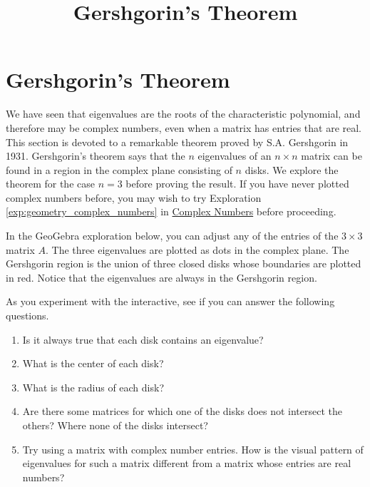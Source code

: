 \documentclass{ximera}
\title{Gershgorin's Theorem} \license{CC BY-NC-SA 4.0}
\begin{document}
\begin{abstract}
\end{abstract}
\maketitle

\section*{Gershgorin's Theorem}
We have seen that eigenvalues are the roots of the characteristic polynomial, and therefore may be complex numbers, even when a matrix has entries that are real.  This section is devoted to a remarkable theorem proved by S.A. Gershgorin in 1931. Gershgorin's theorem says that the $n$ eigenvalues of an $n \times n$ matrix can be found in a region in the complex plane consisting of $n$ disks.  We explore the theorem for the case $n=3$ before proving the result.  If you have never plotted complex numbers before, you may wish to try Exploration \ref{exp:geometry_complex_numbers} in \href{https://ximera.osu.edu/oerlinalg/LinearAlgebra/APX-0020/main}{Complex Numbers} before proceeding.

\begin{exploration}\label{init:GershDisks3x3}
In the GeoGebra exploration below, you can adjust any of the entries of the $3 \times 3$ matrix $A$.  The three eigenvalues are plotted as dots in the complex plane.  The Gershgorin region is the union of three closed disks whose boundaries are plotted in red.  Notice that the eigenvalues are always in the Gershgorin region.

As you experiment with the interactive, see if you can answer the following questions.

\begin{enumerate}
    \item Is it always true that each disk contains an eigenvalue?  
    \item What is the center of each disk?
    \item What is the radius of each disk?
    \item Are there some matrices for which one of the disks does not intersect the others?  Where none of the disks intersect?
    \item Try using a matrix with complex number entries.  How is the visual pattern of eigenvalues for such a matrix different from a matrix whose entries are real numbers?
\end{enumerate}
\begin{center}
\end{center}
\end{exploration}
\end{document}

